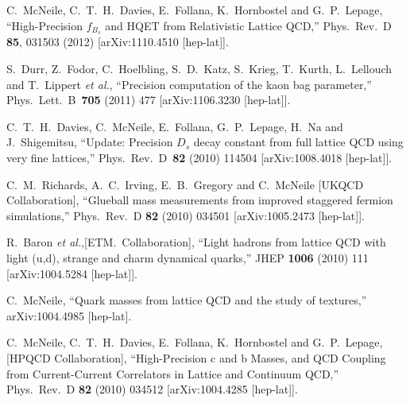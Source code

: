 \begin{thebibliography}{130}
  C.~McNeile, C.~T.~H.~Davies, E.~Follana, K.~Hornbostel and
  G.~P.~Lepage,
  ``High-Precision $f_{B_s}$ and HQET from Relativistic Lattice
  QCD,''
  Phys.\ Rev.\ D {\bf 85}, 031503 (2012)
  [arXiv:1110.4510 [hep-lat]].




  S.~Durr, Z.~Fodor, C.~Hoelbling, S.~D.~Katz, S.~Krieg, T.~Kurth,
  L.~Lellouch and T.~Lippert {\it et al.},
  ``Precision computation of the kaon bag parameter,''
  Phys.\ Lett.\ B\ {\bf 705} (2011) 477
  [arXiv:1106.3230 [hep-lat]].

  C.~T.~H.~Davies, C.~McNeile, E.~Follana, G.~P.~Lepage, H.~Na and
  J.~Shigemitsu,
  ``Update: Precision $D_s$ decay constant from full lattice QCD
  using very fine lattices,''
  Phys.\ Rev.\ D\ {\bf 82} (2010) 114504
  [arXiv:1008.4018 [hep-lat]].

  C.~M.~Richards, A.~C.~Irving, E.~B.~Gregory and C.~McNeile  [UKQCD
                  Collaboration],
  ``Glueball mass measurements from improved staggered fermion
  simulations,''
  Phys.\ Rev.\  D {\bf 82} (2010) 034501
  [arXiv:1005.2473 [hep-lat]].


  R.~Baron {\it et al.},[ETM.~Collaboration],
  ``Light hadrons from lattice QCD with light (u,d), strange and
  charm
  dynamical quarks,''
  JHEP {\bf 1006} (2010) 111
  [arXiv:1004.5284 [hep-lat]].



  C.~McNeile,
  ``Quark masses from lattice QCD and the study of textures,''
  arXiv:1004.4985 [hep-lat].

  C.~McNeile, C.~T.~H.~Davies, E.~Follana, K.~Hornbostel and
  G.~P.~Lepage, [HPQCD Collaboration],
  ``High-Precision c and b Masses, and QCD Coupling from
  Current-Current
  Correlators in Lattice and Continuum QCD,''
  Phys.\ Rev.\  D {\bf 82} (2010) 034512
  [arXiv:1004.4285 [hep-lat]].


\end{thebibliography}
